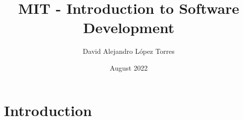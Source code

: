 \documentclass[11pt,letterpaper,spanish]{article}
\title{MIT - Introduction to Software Development}
\author{David Alejandro L\'opez Torres}
\date{August 2022}
\theoremstyle{definition}
\begin{document}
\maketitle

\section{Introduction}
\end{document}
